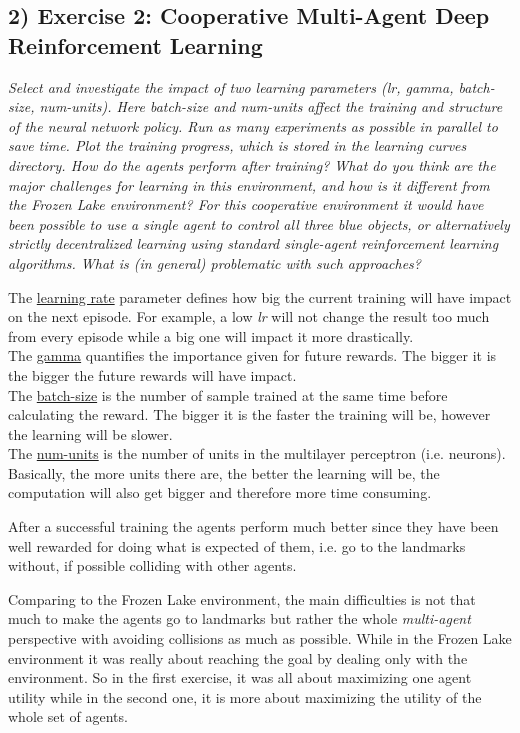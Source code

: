 \documentclass[10pt]{article}
\begin{document}
\subsection*{2) \textbf{ Exercise 2: Cooperative Multi-Agent Deep Reinforcement Learning}}
\textit{Select and investigate the impact of two learning parameters (lr, gamma,
 batch-size, num-units). Here batch-size and num-units affect the training and structure
 of the neural network policy. Run as many experiments as possible in parallel to save time.
 Plot the training progress, which is stored in the learning curves directory. How do the
 agents perform after training? What do you think are the major challenges for learning in
 this environment, and how is it different from the Frozen Lake environment? For this
 cooperative environment it would have been possible to use a single agent to control
 all three blue objects, or alternatively strictly decentralized learning using standard
 single-agent reinforcement learning algorithms. What is (in general) problematic 
 with such approaches?} \medskip

The \underline{learning rate} parameter defines how big the current training will have 
 impact on the next episode. For example, a low \textit{lr} will not change the result
 too much from every episode while a big one will impact it more drastically. \\
The \underline{gamma} quantifies the importance given for future rewards. The bigger it
 is the bigger the future rewards will have impact.\\
The \underline{batch-size} is the number of sample trained at the same time before
 calculating the reward. The bigger it is the faster the training will be, however the
 learning will be slower. \\
The \underline{num-units} is the number of units in the multilayer perceptron (i.e.
 neurons). Basically, the more units there are, the better the learning will be,
 the computation will also get bigger and therefore more time consuming. \medskip

After a successful training the agents perform much better since they have been well
 rewarded for doing what is expected of them, i.e. go to the landmarks without,
 if possible colliding with other agents.\medskip

Comparing to the Frozen Lake environment, the main difficulties is not that much to 
 make the agents go to landmarks but rather the whole \textit{multi-agent} perspective
 with avoiding collisions as much as possible. While in the Frozen Lake environment it
 was really about reaching the goal by dealing only with the environment. So in the first
 exercise, it was all about maximizing one agent utility while in the second one, it is
 more about maximizing the utility of the whole set of agents. \medskip
\end{document}
